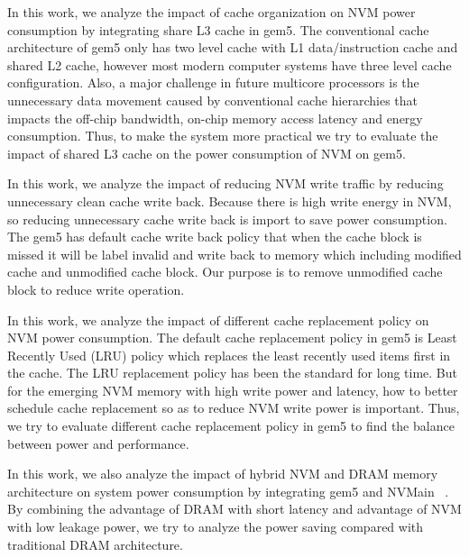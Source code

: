 In this work, we analyze the impact of cache organization on NVM power consumption by integrating share L3 cache in gem5. The conventional cache architecture of gem5 only has two level cache with L1 data/instruction cache and shared L2 cache, however most modern computer systems have three level cache configuration. Also, a major challenge in future multicore processors is the unnecessary data movement caused by conventional cache hierarchies that impacts the off-chip bandwidth, on-chip memory access latency and energy consumption. Thus, to make the system more practical we try to evaluate the impact of shared L3 cache on the power consumption of NVM on gem5. 

In this work, we analyze the impact of reducing NVM write traffic by reducing unnecessary clean cache write back. Because there is high write energy in NVM, so reducing unnecessary cache write back is import to save power consumption. The gem5 has default cache write back policy that when the cache block is missed it will be label invalid and write back to memory which including modified cache and unmodified cache block. Our purpose is to remove unmodified cache block to reduce write operation.  

In this work, we analyze the impact of different cache replacement policy on NVM power consumption. The default cache replacement policy in gem5 is Least Recently Used (LRU) policy which replaces the least recently used items first in the cache. The LRU replacement policy has been the standard for long time. But for the emerging NVM memory with high write power and latency, how to better schedule cache replacement so as to reduce NVM write power is important. Thus, we try to evaluate different cache replacement policy in gem5 to find the balance between power and performance.        

In this work, we also analyze the impact of hybrid NVM and DRAM memory architecture on system power consumption by integrating gem5 and NVMain ~\cite{nvmain}. By combining the advantage of DRAM with short latency and advantage of NVM with low leakage power, we try to analyze the power saving compared with traditional DRAM architecture. 



















